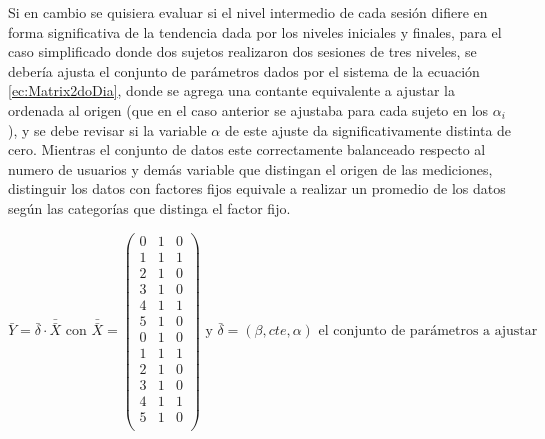 \documentclass{article}
\begin{document}
    Si en cambio se quisiera evaluar si el nivel intermedio de cada sesión difiere en forma significativa de la tendencia dada por los niveles iniciales y finales, para el caso simplificado donde dos sujetos realizaron dos sesiones de tres niveles, se debería ajusta el conjunto de parámetros dados por el sistema de la ecuación \ref{ec:Matrix2doDia}, donde se agrega una contante equivalente a ajustar la ordenada al origen (que en el caso anterior se ajustaba para cada sujeto en los $\alpha_i$), y se debe revisar si la variable $\alpha$ de este ajuste da significativamente distinta de cero. Mientras el conjunto de datos este correctamente balanceado respecto al numero de usuarios y demás variable que distingan el origen de las mediciones, distinguir los datos con factores fijos equivale a realizar un promedio de los datos según las categorías que distinga el factor fijo.

    \begin{equation} \label{ec:MatrixExpandida}
    \bar {Y} = \bar{\delta} \cdot \bar{\bar{X}} \text{ con } \bar{\bar{X}} =
     \begin{pmatrix}
        0 & 1 & 0\\
        1 & 1 & 1\\
        2 & 1 & 0\\
        3 & 1 & 0\\
        4 & 1 & 1\\
        5 & 1 & 0\\
        0 & 1 & 0\\
        1 & 1 & 1\\
        2 & 1 & 0\\
        3 & 1 & 0\\
        4 & 1 & 1\\
        5 & 1 & 0\\
     \end{pmatrix} \text{ y $\bar{\delta}=(\beta,cte,\alpha)$ el conjunto de parámetros a ajustar}
    \end{equation}
\end{document}
